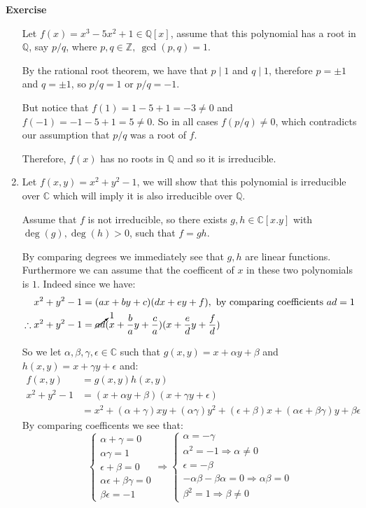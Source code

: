 \documentclass{article}
\newcommand{\Z}{\mathbb{Z}}
\newcommand{\C}{\mathbb{C}}
\newcommand{\Q}{\mathbb{Q}}
\theoremstyle{definition}
\theoremstyle{remark}
\theoremstyle{definition}
\newcounter{exercise}[subsection]
\newenvironment{exercise}{\setcounter{equation}{0}\refstepcounter{exercise}\textbf{Exercise~\theexercise}}{}
\begin{document}
\begin{exercise}
\begin{enumerate}[label= (\alph*)]
        Let $f(x) = x^3-5x^2+1\in\Q[x]$, assume that this polynomial has a root in $\Q$, say $p/q$, where $p,q\in \Z ,\ \gcd(p,q)=1$.

        By the rational root theorem, we have that $p\mid 1$ and $q\mid 1$, therefore $p=\pm 1$ and $q=\pm 1$, so $p/q = 1$ or $p/q=-1$.

        But notice that $f(1) = 1-5+1=-3\not= 0$ and $f(-1) = -1-5+1 = 5\not= 0$. So in all cases $f(p/q)\not=0$, which contradicts our assumption that $p/q$ was a root of $f$.

        Therefore, $f(x)$ has no roots in $\Q$ and so it is irreducible.
        
        \item Let $f(x,y) = x^2+y^2-1$, we will show that this polynomial is irreducible over $\C$ which will imply it is also irreducible over $\Q$.
    
    Assume that $f$ is not irreducible, so there exists $g,h\in \C[x.y]$ with $\deg(g),\deg(h)>0$, such that $f=gh$.
    
    By comparing degrees we immediately see that $g,h$ are linear functions. Furthermore we can assume that the coefficent of $x$ in these two polynomials is $1$. Indeed since we have:\begin{align}
        x^2+y^2-1 &= (ax+by+c)(dx+ey+f), \text{ by comparing coefficients }ad=1\\
        \therefore x^2+y^2-1&= \cancelto{1}{ad}(x+\frac{b}{a}y+\frac{c}{a})(x+\frac{e}{d}y+\frac{f}{d})
    \end{align}

    So we let $\alpha,\beta,\gamma,\epsilon\in \C$ such that $g(x,y) = x+\alpha y+\beta$ and $h(x,y) = x+\gamma y+\epsilon$ and:\begin{align}
        f(x,y) &= g(x,y)h(x,y)\\
        x^2+y^2-1 &= (x+\alpha y+\beta)(x+\gamma y+\epsilon)\\
        &= x^2 +(\alpha+\gamma)xy+(\alpha\gamma)y^2+(\epsilon+\beta)x+(\alpha\epsilon+\beta\gamma)y+\beta\epsilon
    \end{align}
    By comparing coefficents we see that:\[\begin{cases}
        \alpha+\gamma = 0\\
        \alpha\gamma = 1\\
        \epsilon+\beta = 0\\
        \alpha\epsilon + \beta\gamma = 0\\
        \beta\epsilon = -1
    \end{cases}\Rightarrow\begin{cases}
        \alpha=-\gamma\\
        \alpha^2 = -1 \Rightarrow \alpha \not= 0\\
        \epsilon=-\beta\\
        -\alpha\beta - \beta\alpha = 0 \Rightarrow \alpha\beta=0\\
        \beta^2 = 1 \Rightarrow \beta \not= 0
    \end{cases}\]


\end{enumerate}
\end{exercise}
\end{document}
